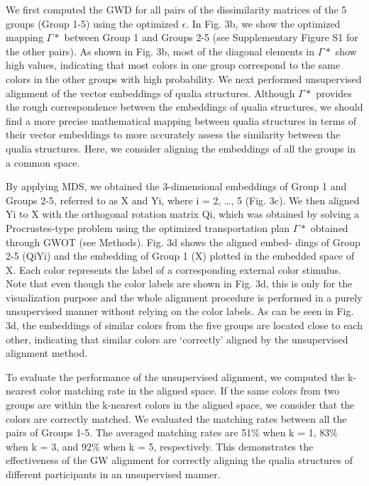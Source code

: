 \documentclass[
  authoryear]{elsarticle}
\begin{document}
We first computed the GWD for all pairs of the dissimilarity matrices of
the 5 groups (Group 1-5) using the optimized \(\epsilon\). In Fig. 3b,
we show the optimized mapping \(\Gamma*\) between Group 1 and Groups 2-5
(see Supplementary Figure S1 for the other pairs). As shown in Fig. 3b,
most of the diagonal elements in \(\Gamma*\) show high values,
indicating that most colors in one group correspond to the same colors
in the other groups with high probability. We next performed
unsupervised alignment of the vector embeddings of qualia structures.
Although \(\Gamma*\) provides the rough correspondence between the
embeddings of qualia structures, we should find a more precise
mathematical mapping between qualia structures in terms of their vector
embeddings to more accurately assess the similarity between the qualia
structures. Here, we consider aligning the embeddings of all the groups
in a common space.

By applying MDS, we obtained the 3-dimensional embeddings of Group 1 and
Groups 2-5, referred to as X and Yi, where i = 2, \ldots, 5 (Fig. 3c).
We then aligned Yi to X with the orthogonal rotation matrix Qi, which
was obtained by solving a Procrustes-type problem using the optimized
transportation plan \(\Gamma*\) obtained through GWOT (see Methods).
Fig. 3d shows the aligned embed- dings of Group 2-5 (QiYi) and the
embedding of Group 1 (X) plotted in the embedded space of X. Each color
represents the label of a corresponding external color stimulus. Note
that even though the color labels are shown in Fig. 3d, this is only for
the visualization purpose and the whole alignment procedure is performed
in a purely unsupervised manner without relying on the color labels. As
can be seen in Fig. 3d, the embeddings of similar colors from the five
groups are located close to each other, indicating that similar colors
are `correctly' aligned by the unsupervised alignment method.

To evaluate the performance of the unsupervised alignment, we computed
the k-nearest color matching rate in the aligned space. If the same
colors from two groups are within the k-nearest colors in the aligned
space, we consider that the colors are correctly matched. We evaluated
the matching rates between all the pairs of Groups 1-5. The averaged
matching rates are 51\% when k = 1, 83\% when k = 3, and 92\% when k =
5, respectively. This demonstrates the effectiveness of the GW alignment
for correctly aligning the qualia structures of different participants
in an unsupervised manner.
\end{document}
